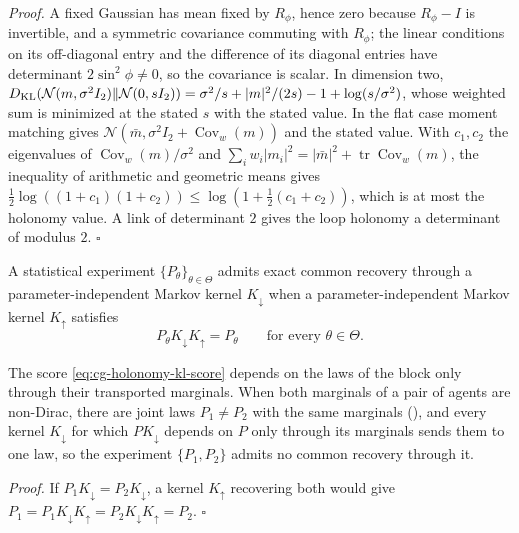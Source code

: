 \noindent\emph{Proof.}
A fixed Gaussian has mean fixed by $R_\phi$, hence zero because $R_\phi-I$ is invertible, and a symmetric
covariance commuting with $R_\phi$; the linear conditions on its off-diagonal entry and the difference of
its diagonal entries have determinant $2\sin^2\phi\neq0$, so the covariance is scalar. In dimension two,
$D_{\mathrm{KL}}(\mathcal N(m,\sigma^2I_2)\Vert\mathcal N(0,sI_2))=\sigma^2/s+\lvert m\rvert^2/(2s)-1+\log(s/\sigma^2)$,
whose weighted sum is minimized at the stated $s$ with the stated value. In the flat case moment matching
gives $\mathcal N(\bar m,\sigma^2I_2+\operatorname{Cov}_w(m))$ and the stated value. With $c_1,c_2$ the
eigenvalues of $\operatorname{Cov}_w(m)/\sigma^2$ and
$\sum_iw_i\lvert m_i\rvert^2=\lvert\bar m\rvert^2+\operatorname{tr}\operatorname{Cov}_w(m)$, the inequality of
arithmetic and geometric means gives $\tfrac12\log((1+c_1)(1+c_2))\leq\log(1+\tfrac12(c_1+c_2))$, which is at
most the holonomy value. A link of determinant $2$ gives the loop holonomy a determinant of modulus $2$.
$\square$

A statistical experiment $\{P_\theta\}_{\theta\in\Theta}$ admits exact common recovery through a
parameter-independent Markov kernel $K_\downarrow$ when a parameter-independent Markov kernel $K_\uparrow$
satisfies
\begin{equation}
P_\theta K_\downarrow K_\uparrow=P_\theta\qquad\text{for every }\theta\in\Theta.
\label{eq:cg-holonomy-common-recovery}
\end{equation}

The score \eqref{eq:cg-holonomy-kl-score} depends on the laws of the block only through their transported
marginals. When both marginals of a pair of agents are non-Dirac, there are joint laws $P_1\neq P_2$ with
the same marginals (), and every kernel $K_\downarrow$ for
which $PK_\downarrow$ depends on $P$ only through its marginals sends them to one law, so the experiment
$\{P_1,P_2\}$ admits no common recovery through it. 

\noindent\emph{Proof.}
If $P_1K_\downarrow=P_2K_\downarrow$, a kernel $K_\uparrow$ recovering both would give
$P_1=P_1K_\downarrow K_\uparrow=P_2K_\downarrow K_\uparrow=P_2$. $\square$

